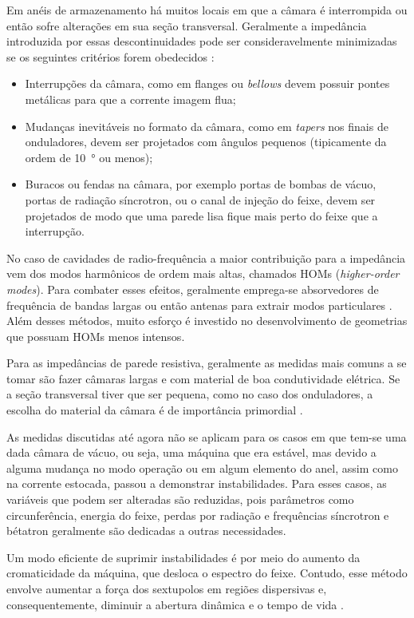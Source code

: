 Em anéis de armazenamento há muitos locais em que a câmara é interrompida ou então sofre alterações em sua seção transversal. Geralmente a impedância introduzida por essas descontinuidades pode ser consideravelmente minimizadas se os seguintes critérios forem obedecidos \cite{Khan}:
\begin{itemize}
 \item Interrupções da câmara, como em flanges ou \textit{bellows} devem possuir pontes metálicas para que a corrente imagem flua;
 \item Mudanças inevitáveis no formato da câmara, como em \textit{tapers} nos finais de onduladores, devem ser projetados com ângulos pequenos (tipicamente da ordem de \SI{10}{\degree} ou menos);
 \item Buracos ou fendas na câmara, por exemplo portas de bombas de vácuo, portas de radiação síncrotron, ou o canal de injeção do feixe, devem ser projetados de modo que uma parede lisa fique mais perto do feixe que a interrupção.
\end{itemize}

No caso de cavidades de radio-frequência a maior contribuição para a impedância vem dos modos harmônicos de ordem mais altas, chamados HOMs (\textit{higher-order modes}). Para combater esses efeitos, geralmente emprega-se absorvedores de frequência de bandas largas ou então antenas para extrair modos particulares \cite{YellowCERN95}. Além desses métodos, muito esforço é investido no desenvolvimento de geometrias que possuam HOMs menos intensos.

Para as impedâncias de parede resistiva, geralmente as medidas mais comuns a se tomar são fazer câmaras largas e com material de boa condutividade elétrica. Se a seção transversal tiver que ser pequena, como no caso dos onduladores, a escolha do material da câmara é de importância primordial \cite{Khan}.

As medidas discutidas até agora não se aplicam para os casos em que tem-se uma dada câmara de vácuo, ou seja, uma máquina que era estável, mas devido a alguma mudança no modo operação ou em algum elemento do anel, assim como na corrente estocada, passou a demonstrar instabilidades. Para esses casos, as variáveis
que podem ser alteradas são reduzidas, pois parâmetros como circunferência, energia do feixe, perdas por radiação e frequências síncrotron e bétatron geralmente são dedicadas a outras necessidades.

Um modo eficiente de suprimir instabilidades é por meio do aumento da cromaticidade da máquina, que desloca o espectro do feixe. Contudo, esse método envolve aumentar a força dos sextupolos em regiões dispersivas e, consequentemente, diminuir a abertura dinâmica e o tempo de vida \cite{Khan}.

